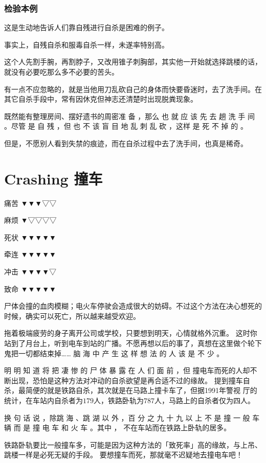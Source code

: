 \documentclass[UTF8]{ctexart}
\begin{document}
\subsubsection*{检验本例}

这是生动地告诉人们靠自残进行自杀是困难的例子。

事实上，自残自杀和服毒自杀一样，未遂率特别高。

这个人先割手腕，再割脖子，又改用锥子刺胸部，其实他一开始就选择跳楼的话，就没有必要吃那么多不必要的苦头。

有一点不应忽略的，就是当他用刀乱砍自己的身体而快要昏迷时，去了洗手间。在其它自杀手段中，常有因休克但神志还清楚时出现脱粪现象。

既然能有整理房间、摆好遗书的周密准 备 ，那么 也 就 应 该 先 去 趟 洗 手 间 。尽管 是 自 残 ，但 也 不 该 盲 目 地 乱 刺 乱 砍 ，这样 是 死 不 掉 的 。

但是，不愿别人看到失禁的痕迹，而在自杀过程中去了洗手间，也真是稀奇。

\newpage

\section{Crashing 撞车}

痛苦 ▼▼▼▽▽

麻烦 ▼▽▽▽▽

死状 ▼▼▼▼▼

牵连 ▼▼▼▼▼

冲击 ▼▼▼▼▽

致命 ▼▼▼▼▼

尸体会撞的血肉模糊；电火车停驶会造成很大的妨碍。不过这个方法在决心想死的时候，确实可以死亡，所以越来越受欢迎。

拖着极端疲劳的身子离开公司或学校，只要想到明天，心情就格外沉重。
这时你站到了月台上，听到电车到站的广播。不愿再想以后的事了，真想在这里做个轮下鬼把一切都结束掉……
脑 海 中 产 生 这 样 想 法 的 人 该 是 不 少 。

明 明 知 道 将 把 凄 惨 的 尸 体 暴 露 在 人 们 面 前 ，但 撞电车而死的人却不断出现，恐怕是这种方法对冲动的自杀欲望是再合适不过的缘故。 提到撞车自杀，最简便的就是铁路自杀，其次就是在马路上撞卡车了，但据1991年警视 厅的统计，在车站内自杀者为$179$人，铁路卧轨为$787$人，马路上的自杀者仅为四人。

换 句 话 说 ，除跳 海 、跳 湖 以 外 ，百 分 之 九 十 九 以 上 不 是 撞 一 般 车 辆 而 是 撞 电 车 和 火 车 。其中 ， 不在车站而在铁路上卧轨的居多。

铁路卧轨要比一般撞车多，可能是因为这种方法的「致死率」高的缘故，与上吊、跳楼一样是必死无疑的手段。
要想撞车而死，那就毫不迟疑地去撞电车吧！
\end{document}
